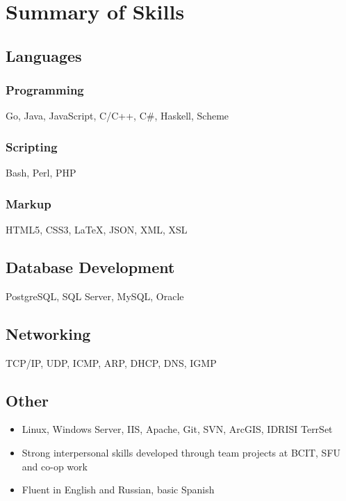 \documentclass{ik-resume}
\begin{document}
\pagestyle{main}
\thispagestyle{empty}




\section{Summary of Skills}

\subsection{Languages}

\subsubsection{Programming}

Go, Java, JavaScript, C/C++, C\#, Haskell, Scheme

\subsubsection{Scripting}

Bash, Perl, PHP

\subsubsection{Markup}

HTML5, CSS3, {\LaTeX}, JSON, XML, XSL

\subsection{Database Development}

PostgreSQL, SQL Server, MySQL, Oracle

\subsection{Networking}

TCP/IP, UDP, ICMP, ARP, DHCP, DNS, IGMP

\subsection{Other}

\begin{itemize}
  \itemsep0em
  \item Linux, Windows Server, IIS, Apache, Git, SVN, ArcGIS, IDRISI TerrSet
  \item Strong interpersonal skills developed through team projects at BCIT, SFU and co-op work
  \item Fluent in English and Russian, basic Spanish
\end{itemize}
\end{document}

